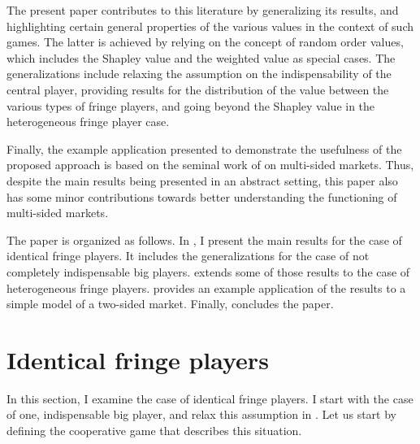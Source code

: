 \documentclass[a4paper]{article}
\begin{document}
The present paper contributes to this literature by generalizing its results, and highlighting certain general properties of the various values in the context of such games.
The latter is achieved by relying on the concept of random order values, which includes the Shapley value and the weighted value as special cases.
The generalizations include relaxing the assumption on the indispensability of the central player, providing results for the distribution of the value between the various types of fringe players, and going beyond the Shapley value in the heterogeneous fringe player case.

Finally, the example application presented to demonstrate the usefulness of the proposed approach is based on the seminal work of \textcite{armstrong2006competition} on multi-sided markets.
Thus, despite the main results being presented in an abstract setting, this paper also has some minor contributions towards better understanding the functioning of multi-sided markets.

The paper is organized as follows.
In , I present the main results for the case of identical fringe players.
It includes the generalizations for the case of not completely indispensable big players.
 extends some of those results to the case of heterogeneous fringe players.
 provides an example application of the results to a simple model of a two-sided market.
Finally,  concludes the paper.


\section{Identical fringe players}
\label{sec:one_sided}

In this section, I examine the case of identical fringe players.
I start with the case of one, indispensable big player, and relax this assumption in .
Let us start by defining the cooperative game that describes this situation.
\end{document}
